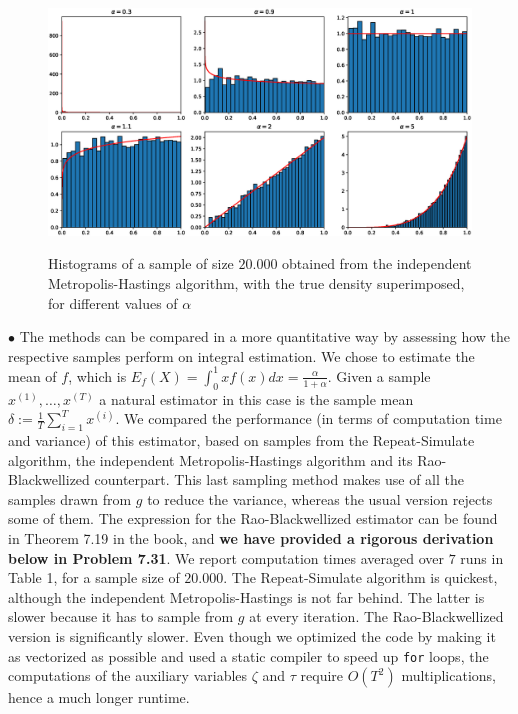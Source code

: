 \documentclass[a4paper,11pt, hidelinks]{article}
\begin{document}
\begin{figure}[H]
\centering
 \includegraphics[scale=0.5]{plot2.eps}  \\
\caption{Histograms of a sample of size $20.000$ obtained from the independent Metropolis-Hastings algorithm, with the true density superimposed, for different values of $\alpha$}
\end{figure}

\hfill \newline 
\noindent $\bullet$  The methods can be compared in a more quantitative way by assessing how the respective samples perform on integral estimation. We chose to estimate the mean of $f$, which is $\displaystyle E_f(X) = \int_0^1 x f(x) dx = \frac{\alpha}{1+\alpha}$.\newline
Given a sample $x^{(1)},\ldots, x^{(T)}$ a natural estimator in this case is the sample mean $\delta := \frac 1T \sum_{i=1}^T x^{(i)}$.\newline
\newline
We compared the performance (in terms of computation time and variance) of this estimator, based on samples from the Repeat-Simulate algorithm, the independent Metropolis-Hastings algorithm and its Rao-Blackwellized counterpart. This last sampling method makes use of all the samples drawn from $g$ to reduce the variance, whereas the usual version rejects some of them. The expression for the Rao-Blackwellized estimator can be found in Theorem 7.19 in the book, and \textbf{we have provided a rigorous derivation below in Problem 7.31}. \newline \newline
We report computation times averaged over $7$ runs in Table 1, for a sample size of $20.000$. The Repeat-Simulate algorithm is quickest, although the independent Metropolis-Hastings is not far behind. The latter is slower because it has to sample from $g$ at every iteration. The Rao-Blackwellized version is significantly slower. Even though we optimized the code by making it as vectorized as possible and used a static compiler to speed up \verb!for! loops, the computations of the auxiliary variables $\zeta$ and $\tau$ require $O(T^2)$ multiplications, hence a much longer runtime.
\end{document}
